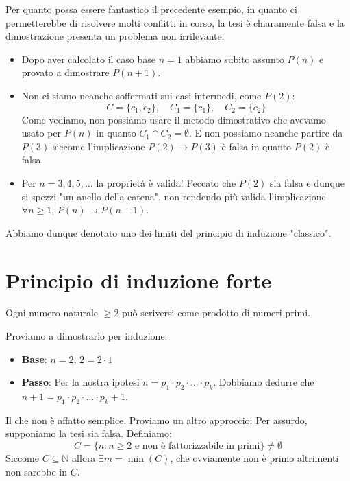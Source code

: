 \documentclass[12pt]{report}
\newcommand{\N}{\mathbb{N}}
\begin{document}
	Per quanto possa essere fantastico il precedente esempio, in quanto ci permetterebbe di risolvere molti conflitti in corso, la tesi è chiaramente falsa e la dimostrazione presenta un problema non irrilevante:
	
	\begin{itemize}
		\item Dopo aver calcolato il caso base $n = 1$ abbiamo subito assunto $P(n)$ e provato a dimostrare $P(n+1)$.
		\item Non ci siamo neanche soffermati sui casi intermedi, come $P(2)$:
		\[
		C = \{c_1, c_2\}, \quad C_1 = \{c_1\}, \quad C_2 = \{c_2\}
		\]
		Come vediamo, non possiamo usare il metodo dimostrativo che avevamo usato per $P(n)$ in quanto $C_1 \cap C_2 = \emptyset$.
		E non possiamo neanche partire da $P(3)$ siccome l'implicazione $P(2) \to P(3)$ è falsa in quanto $P(2)$ è falsa.
		\item Per $n = 3, 4, 5, \dots$ la proprietà è valida! Peccato che $P(2)$ sia falsa e dunque si spezzi "un anello della catena", non rendendo più valida l'implicazione $\forall n \ge 1, \, P(n) \to P(n+1)$.
	\end{itemize}
	
	Abbiamo dunque denotato uno dei limiti del principio di induzione "classico".
	
	\section{Principio di induzione forte}
	
	\begin{teorema}{}{}
		Ogni numero naturale $\ge 2$ può scriversi come prodotto di numeri primi.
	\end{teorema}
	
	Proviamo a dimostrarlo per induzione:
	\begin{itemize}
		\item \textbf{Base}: $n = 2, \, 2 = 2 \cdot 1$ \checkmark
		\item \textbf{Passo}: Per la nostra ipotesi $n = p_1 \cdot p_2 \cdot \dots \cdot p_k$. Dobbiamo dedurre che $n + 1 = p_1 \cdot p_2 \cdot \dots \cdot p_k + 1$.
	\end{itemize}
	
	Il che non è affatto semplice. Proviamo un altro approccio:
	Per assurdo, supponiamo la tesi sia falsa. Definiamo:
	\[
	C = \{n : n \ge 2 \text{ e non è fattorizzabile in primi}\} \neq \emptyset
	\]
	Siccome $C \subseteq \N$ allora $\exists m = \min(C)$, che ovviamente non è primo altrimenti non sarebbe in $C$.
	
\end{document}
